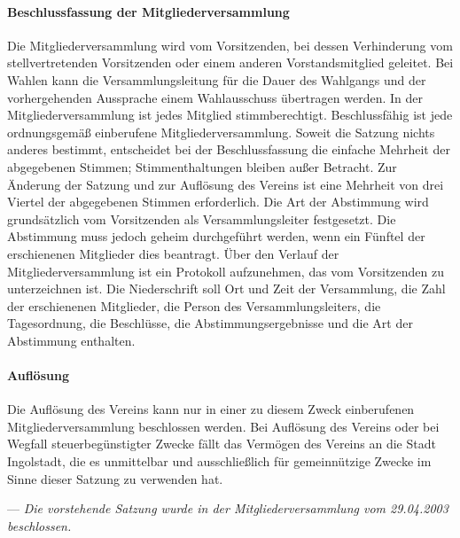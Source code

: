 \begin{multicols}{2}
\paragraph{Beschlussfassung der Mitgliederversammlung}
Die Mitgliederversammlung wird vom Vorsitzenden, bei dessen
Verhinderung vom stellvertretenden Vorsitzenden oder einem anderen
Vorstandsmitglied geleitet. Bei Wahlen kann die Versammlungsleitung für
die Dauer des Wahlgangs und der vorhergehenden Aussprache einem
Wahlausschuss übertragen werden. In der Mitgliederversammlung ist jedes
Mitglied stimmberechtigt. Beschlussfähig ist jede ordnungsgemäß
einberufene Mitgliederversammlung. Soweit die Satzung nichts anderes
bestimmt, entscheidet bei der Beschlussfassung die einfache Mehrheit der
abgegebenen Stimmen; Stimmenthaltungen bleiben außer Betracht. Zur
Änderung der Satzung und zur Auflösung des Vereins ist eine Mehrheit von
drei Viertel der abgegebenen Stimmen erforderlich. Die Art der Abstimmung
wird grundsätzlich vom Vorsitzenden als Versammlungsleiter festgesetzt.
Die Abstimmung muss jedoch geheim durchgeführt werden, wenn ein
Fünftel der erschienenen Mitglieder dies beantragt.
Über den Verlauf der Mitgliederversammlung ist ein Protokoll aufzunehmen,
das vom Vorsitzenden zu unterzeichnen ist. Die Niederschrift soll Ort und
Zeit der Versammlung, die Zahl der erschienenen Mitglieder, die Person
des Versammlungsleiters, die Tagesordnung, die Beschlüsse, die
Abstimmungsergebnisse und die Art der Abstimmung enthalten.

\paragraph{Auflösung}
Die Auflösung des Vereins kann nur in einer zu diesem Zweck einberufenen
Mitgliederversammlung beschlossen werden. Bei Auflösung des Vereins
oder bei Wegfall steuerbegünstigter Zwecke fällt das Vermögen des
Vereins an die Stadt Ingolstadt, die es unmittelbar und ausschließlich für
gemeinnützige Zwecke im Sinne dieser Satzung zu verwenden hat.

\end{multicols}

\vfill
--- \emph{Die vorstehende Satzung wurde in der Mitgliederversammlung vom
29.04.2003 beschlossen.}
\clearpage
